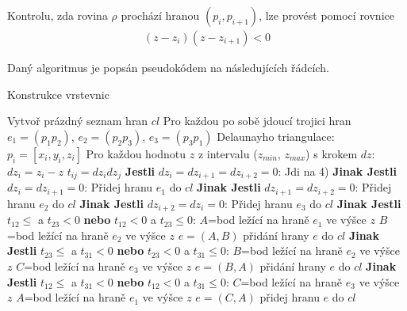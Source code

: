 \documentclass[a4paper,12pt]{article}
\begin{document}
    Kontrolu, zda rovina  $\rho$ prochází hranou $(p_i, p_{i+1})$, lze provést pomocí rovnice
    \begin{align*}
        (z - z_i)(z - z_{i+1}) < 0
    \end{align*}

    Daný algoritmus je popsán pseudokódem na následujících řádcích.
    
    \begin{algorithm}[H]
    \caption {Konstrukce vrstevnic}
    \begin{algorithmic}[1]
        \State Vytvoř prázdný seznam hran $cl$
        \State Pro každou po sobě jdoucí trojici hran $e_{1} = (p_{1} p_{2})$, $e_{2} = (p_{2} p_{3})$, $e_{3} = (p_{3} p_{1})$ Delaunayho triangulace:
        \State \indent $p_{i} = [x_{i}, y_{i}, z_{i}]$
        \State \indent Pro každou hodnotu $z$ z intervalu ($z_{min}$, $z_{max}$) s krokem $dz$:
        \State \indent\indent $dz_{i} = z_{i} - z$
        \State \indent\indent $t_{ij} = dz_{i}dz_{j}$
        \State \indent\indent \textbf{Jestli} $dz_{i}=dz_{i+1}=dz_{i+2}=0$:
        \State \indent\indent\indent Jdi na 4)
        \State \indent\indent \textbf{Jinak Jestli} $dz_{i}=dz_{i+1}=0$:
        \State \indent\indent\indent Přidej hranu $e_{1}$ do $cl$
        \State \indent\indent \textbf{Jinak Jestli} $dz_{i+1}=dz_{i+2}=0$:
        \State \indent\indent\indent Přidej hranu $e_{2}$ do $cl$
        \State \indent\indent \textbf{Jinak Jestli} $dz_{i+2}=dz_{i}=0$:
        \State \indent\indent\indent Přidej hranu $e_{3}$ do $cl$
        \State \indent\indent \textbf{Jinak Jestli} $t_{12}\leq$ a $t_{23}<0$ \textbf{nebo} $t_{12}<0$ a $t_{23}\leq0$:
        \State \indent\indent\indent $A$=bod ležící na hraně $e_{1}$ ve výšce $z$
        \State \indent\indent\indent $B$=bod ležící na hraně $e_{2}$ ve výšce $z$
        \State \indent\indent\indent $e = (A,B)$
        \State \indent\indent\indent přidání hrany $e$ do $cl$
        \State \indent\indent \textbf{Jinak Jestli} $t_{23}\leq$ a $t_{31}<0$ \textbf{nebo} $t_{23}<0$ a $t_{31}\leq0$:
        \State \indent\indent\indent $B$=bod ležící na hraně $e_{2}$ ve výšce $z$
        \State \indent\indent\indent $C$=bod ležící na hraně $e_{3}$ ve výšce $z$
        \State \indent\indent\indent $e = (B,A)$
        \State \indent\indent\indent přidání hrany $e$ do $cl$
        \State \indent\indent \textbf{Jinak Jestli} $t_{12}\leq$ a $t_{31}<0$ \textbf{nebo} $t_{12}<0$ a $t_{31}\leq0$:
        \State \indent\indent\indent $C$=bod ležící na hraně $e_{3}$ ve výšce $z$
        \State \indent\indent\indent $A$=bod ležící na hraně $e_{1}$ ve výšce $z$
        \State \indent\indent\indent $e = (C,A)$
        \State \indent\indent\indent přidej hranu $e$ do $cl$
    \end{algorithmic}
    \end{algorithm}
\end{document}
